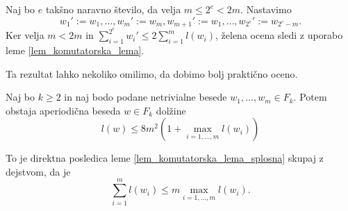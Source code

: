 \documentclass[mat1, tisk]{fmfdelo}
\numberwithin{equation}{section}  %
\begin{document}



\begin{dokaz}
    Naj bo $e$ takšno naravno število, da velja $m \le 2^{e} < 2m$. Nastavimo \begin{equation*}
    w_1' := w_1, \ldots, w_{m}' := w_{m}, w_{m+1}' := w_1, \ldots, w_{2^{e}}' := w_{2^{e} - m}. 
    \end{equation*}
    Ker velja $m < 2m$ in $\sum_{i = 1}^{2^{e}} w_i' \le 2 \sum_{i = 1}^{m} l(w_i)$, želena ocena sledi z uporabo leme \ref{lem_komutatorska_lema}.  
\end{dokaz}


Ta rezultat lahko nekoliko omilimo, da dobimo bolj praktično oceno.
\begin{posledica}
\label{psl_komutatorska_lema_prakticna}
Naj bo $k \ge 2$ in naj bodo podane netrivialne besede $w_1, \ldots, w_m \in  F_k$. Potem obstaja aperiodična beseda $w \in  F_k$ dolžine \begin{equation*}
l(w) \le 8m^2 (1 +  \max_{i = 1, \ldots, m} l(w_i) )
\end{equation*}      
\end{posledica}
\begin{dokaz}
    To je direktna posledica leme \ref{lem_komutatorska_lema_splosna} skupaj z dejstvom, da je \begin{equation*}
    \sum_{i = 1}^{m} l(w_{i}) \le m \max_{i = 1, \ldots, m} l(w_i).
    \end{equation*}  
\end{dokaz}
\end{document}

